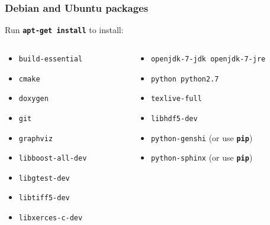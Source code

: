 \documentclass{beamer}
\newcommand{\cmd}[1]{\textbf{\texttt{#1}}}
\newcommand{\pkg}[1]{\texttt{#1}}
\begin{document}
\begin{frame}
  \frametitle{Debian and Ubuntu packages}
  \scriptsize
  Run \cmd{apt-get install} to install:
  \begin{columns}
    \begin{column}{.5\linewidth}
      \begin{itemize}
      \item[] \pkg{build-essential}
      \item[] \pkg{cmake}
      \item[] \pkg{doxygen}
      \item[] \pkg{git}
      \item[] \pkg{graphviz}
      \item[] \pkg{libboost-all-dev}
      \item[] \pkg{libgtest-dev}
      \item[] \pkg{libtiff5-dev}
      \item[] \pkg{libxerces-c-dev}
      \end{itemize}
    \end{column}
    \begin{column}{.5\linewidth}
      \begin{itemize}
      \item[] \pkg{openjdk-7-jdk openjdk-7-jre}
      \item[] \pkg{python python2.7}
      \item[] \pkg{texlive-full}
      \item[] \pkg{libhdf5-dev}
      \item[] \pkg{python-genshi} (or use \cmd{pip})
      \item[] \pkg{python-sphinx} (or use \cmd{pip})
      \end{itemize}
    \end{column}
  \end{columns}
\end{frame}
\end{document}
